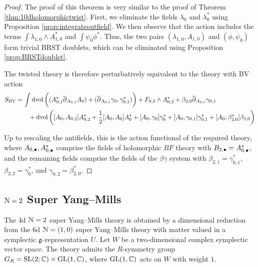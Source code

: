 \documentclass[10pt, oneside]{article}
\begin{document}
\begin{proof}
The proof of this theorem is very similar to the proof of Theorem \ref{thm:10dholomorphictwist}.  
First, we eliminate the fields $\lambda_0$ and $\lambda_0^*$ using Proposition \ref{prop:integrateoutfield}.  
We then observe that the action includes the terms $\int \lambda_{1,0} \wedge A_{1,0}^*$ and  $\int \psi_0\phi^*$. Thus, the two pairs $(\lambda_{1,0}, A_{1,0})$ and $(\phi, \psi_0)$ form trivial BRST doublets, which can be eliminated using Proposition \ref{prop:BRSTdoublet}.

The twisted theory is therefore perturbatively equivalent to the theory with BV action 
\begin{align*}
S_{\rm BV} & = \int \operatorname{dvol} \bigg((A_{0,1}^* \overline{\partial}_{A_{0,1}} A_{0}) + (\overline{\partial}_{A_{0,1}} \gamma_0, \gamma_{0,1}^*)\bigg) + F_{0,2} \wedge A_{0,2}^* + \beta_{2,0} \overline{\partial}_{A_{0,1}} \gamma_{0,1} \\ & \qquad + \operatorname{dvol} \bigg([A_0, A_{0,2}] A_{0,2}^* + \frac{1}{2} [A_0,A_0] A_0^* + [A_0, \gamma_0] \gamma_0^* + [A_0, \gamma_{0,1}] \gamma_{0,1}^* + [A_0, \beta_{2,0}^*] \beta_{2,0}\bigg)
\end{align*}

Up to rescaling the antifields, this is the action functional of the required theory, where $A_{0,\bullet}, A_{0,\bullet}^*$ comprise the fields of holomorphic $BF$ theory with $B_{2,\bullet} = A_{0,\bullet}^*$, and the remaining fields comprise the fields of the $\beta\gamma$ system with $\beta_{2,1} = \gamma_{0,1}^*$, $\beta_{2,2} = \gamma_0^*$, and $\gamma_{0,2} = \beta_{2,0}^*$.
\end{proof}

\subsection{\texorpdfstring{$\mathcal N=2$}{N=2} Super Yang--Mills} \label{4d_2_section}

The 4d $\mathcal N=2$ super Yang--Mills theory is obtained by a dimensional reduction from the 6d $\mathcal N=(1, 0)$ super Yang--Mills theory with matter valued in a symplectic $\mathfrak g$-representation $U$. Let $W$ be a two-dimensional complex symplectic vector space. The theory admits the $R$-symmetry group $G_R=\mathrm{SL}(2;\mathbb C)\times \mathrm{GL}(1, \mathbb C)$, where $\mathrm{GL}(1, \mathbb C)$ acts on $W$ with weight $1$.

\vspace{-10pt}
\end{document}
